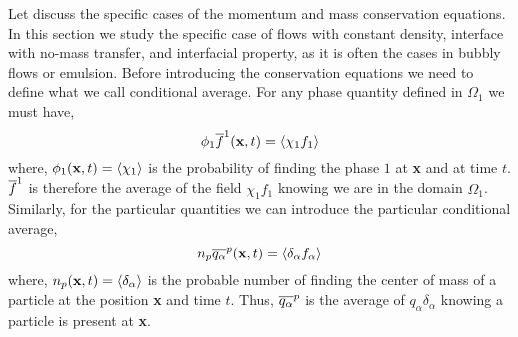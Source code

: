 Let discuss the specific cases of the momentum and mass conservation equations.
In this section we study the specific case of flows with constant density, interface with no-mass transfer, and interfacial property, as it is often the cases in bubbly flows or emulsion. 
Before introducing the conservation equations we need to define what we call conditional average. 
For any phase quantity defined in $\Omega_1$ we must have, 
\begin{equation}
    \phi_1\overline{f}^1(\textbf{x},t) = \left<\chi_1 f_1\right>
\end{equation}
where, $\phi_1(\textbf{x},t) = \left<\chi_1\right>$ is the probability of finding the phase $1$ at \textbf{x} and at time $t$. 
$\overline{f}^1$ is therefore the average of the field $\chi_1 f_1$ knowing we are in the domain $\Omega_1$.
Similarly, for the particular quantities we can introduce the particular conditional average, 
\begin{equation}
     n_p\overline{q_\alpha}^{p}(\textbf{x},t) = \left<\delta_\alpha f_\alpha\right>
\end{equation}
where, $n_p(\textbf{x},t) = \left<\delta_\alpha\right>$ is the probable number of finding the center of mass of a particle at the position \textbf{x} and time $t$. 
Thus, $\overline{q_\alpha}^{p}$ is the average of $q_\alpha\delta_\alpha$ knowing a particle is present at \textbf{x}. 


